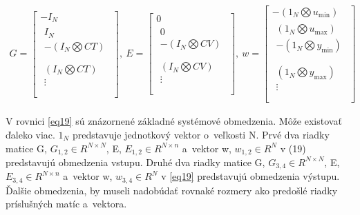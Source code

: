 \begin{equation} \label{eq19}
\begin{split}
G = \begin{bmatrix}
{- I}_{N} \\
\begin{matrix}
I_{N} \\
 - (I_{N}\bigotimes CT) \\
\end{matrix} \\
\begin{matrix}
(I_{N}\bigotimes CT) \\
 \vdots \\
\end{matrix} \\
\end{bmatrix},\ E = \begin{bmatrix}
0 \\
\begin{matrix}
0 \\
 - (I_{N}\bigotimes CV) \\
\end{matrix} \\
\begin{matrix}
(I_{N}\bigotimes CV) \\
 \vdots \\
\end{matrix} \\
\end{bmatrix},\ w = \begin{bmatrix}
 - (1_{N}\bigotimes u_{\min}) \\
\begin{matrix}
(1_{N}\bigotimes u_{\max}) \\
 - (1_{N}\bigotimes y_{\min}) \\
\end{matrix} \\
\begin{matrix}
(1_{N}\bigotimes y_{\max}) \\
 \vdots \\
\end{matrix} \\
\end{bmatrix}
\end{split}
\end{equation}

V rovnici \ref{eq19} sú znázornené základné systémové obmedzenia. Môže
existovať ďaleko viac. \(1_{N}\) predstavuje jednotkový vektor
o~veľkosti N. Prvé dva riadky matice G, \(G_{1,2} \in R^{N \times N}\),
E, \(E_{1,2} \in R^{N \times n}\) a~vektor w, \(w_{1,2} \in R^{N}\) v
(19) predstavujú obmedzenia vstupu. Druhé dva riadky matice G,
\(G_{3,4} \in R^{N \times N}\), E, \(E_{3,4} \in R^{N \times n}\)
a~vektor w, \(w_{3,4} \in R^{N}\) v \ref{eq19} predstavujú obmedzenia výstupu.
Ďalšie obmedzenia, by museli nadobúdať rovnaké rozmery ako predošlé
riadky príslušných matíc a~vektora.

